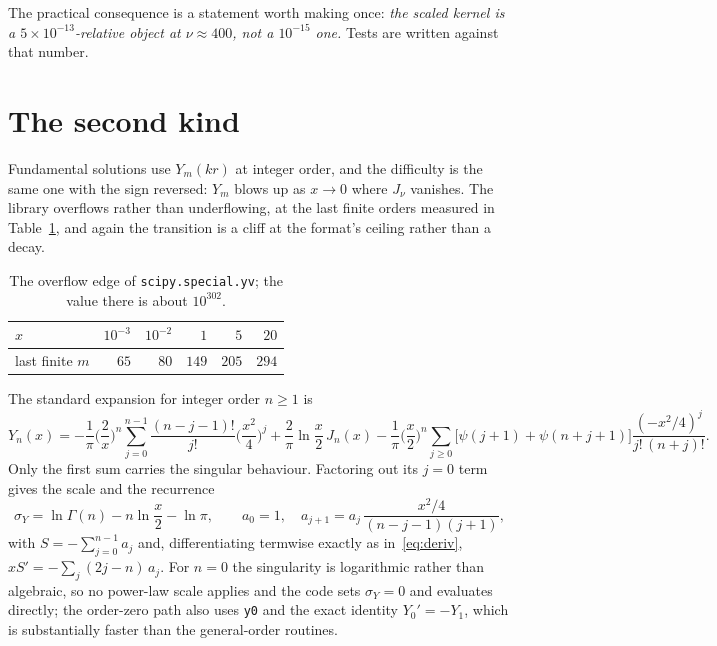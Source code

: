 \documentclass[11pt]{article}
\theoremstyle{remark}
\newcommand{\code}[1]{\texttt{#1}}
\begin{document}
The practical consequence is a statement worth making once: \emph{the scaled kernel is a
$5\times10^{-13}$-relative object at $\nu\approx400$, not a $10^{-15}$ one.} Tests are written
against that number.

\section{The second kind}

Fundamental solutions use $Y_m(kr)$ at integer order, and the difficulty is the same one with
the sign reversed: $Y_m$ blows up as $x\to0$ where $J_\nu$ vanishes. The library overflows
rather than underflowing, at the last finite orders measured in
Table~\ref{tab:yoverflow}, and again the transition is a cliff at the format's ceiling rather
than a decay.

\begin{table}[h]
\centering
\begin{tabular}{lrrrrr}
\toprule
$x$ & $10^{-3}$ & $10^{-2}$ & $1$ & $5$ & $20$\\
\midrule
last finite $m$ & $65$ & $80$ & $149$ & $205$ & $294$\\
\bottomrule
\end{tabular}
\caption{The overflow edge of \code{scipy.special.yv}; the value there is about $10^{302}$.}
\label{tab:yoverflow}
\end{table}

The standard expansion for integer order $n\ge1$ is
\[
  Y_n(x) = -\frac{1}{\pi}\Big(\frac{2}{x}\Big)^{n}\sum_{j=0}^{n-1}\frac{(n-j-1)!}{j!}
           \Big(\frac{x^2}{4}\Big)^{j}
         + \frac{2}{\pi}\ln\frac{x}{2}\,J_n(x)
         - \frac{1}{\pi}\Big(\frac{x}{2}\Big)^{n}\!\!\sum_{j\ge0}\!\big[\psi(j{+}1){+}\psi(n{+}j{+}1)\big]
           \frac{(-x^2/4)^j}{j!\,(n+j)!}.
\]
Only the first sum carries the singular behaviour. Factoring out its $j=0$ term gives the
scale and the recurrence
\begin{equation}
  \sigma_Y = \ln\Gamma(n) - n\ln\frac{x}{2} - \ln\pi,
  \qquad a_0=1,\quad a_{j+1}=a_j\,\frac{x^2/4}{(n-j-1)(j+1)},
\end{equation}
with $S=-\sum_{j=0}^{n-1}a_j$ and, differentiating termwise exactly as in~\eqref{eq:deriv},
$x S' = -\sum_j (2j-n)\,a_j$. For $n=0$ the singularity is logarithmic rather than algebraic,
so no power-law scale applies and the code sets $\sigma_Y=0$ and evaluates directly; the
order-zero path also uses \code{y0} and the exact identity $Y_0'=-Y_1$, which is
substantially faster than the general-order routines.
\end{document}
